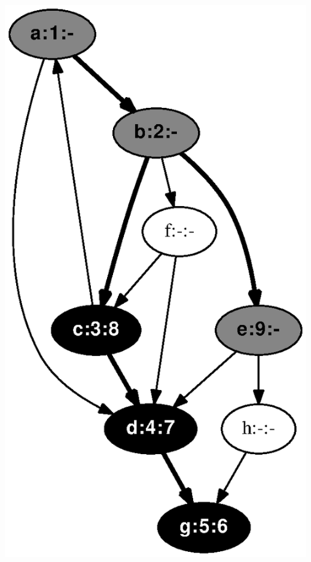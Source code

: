 \documentclass{article}
\begin{document}
\includegraphics[height=.3\textheight]{dfs_directed_classroom_09.eps}
\vspace{1em}
\end{document}
